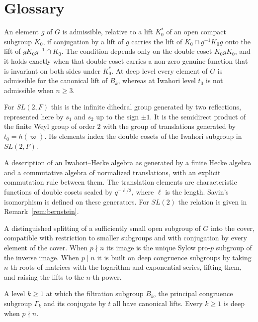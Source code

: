 \documentclass[12pt,letterpaper]{amsart}
\numberwithin{equation}{section}
\theoremstyle{definition}
\theoremstyle{remark}
\begin{document}
\section*{Glossary}

\begin{description}[leftmargin=1.5em,style=nextline]
\item[Admissible element] An element $g$ of $G$ is admissible, relative
to a lift $K_0^*$ of an open compact subgroup $K_0$, if conjugation by a
lift of $g$ carries the lift of $K_0\cap g^{-1}K_0g$ onto the lift of
$gK_0g^{-1}\cap K_0$. The condition depends only on the double coset
$K_0gK_0$, and it holds exactly when that double coset carries a
non-zero genuine function that is invariant on both sides under
$K_0^*$. At deep level every element of $G$ is admissible for the
canonical lift of $B_k$, whereas at Iwahori level $t_0$ is not
admissible when $n\geq 3$.
\item[Affine Weyl group] For $SL(2,F)$ this is the infinite dihedral
group generated by two reflections, represented here by $s_1$ and $s_2$
up to the sign $\pm 1$. It is the semidirect product of the finite Weyl
group of order $2$ with the group of translations generated by
$t_0=h(\varpi)$. Its elements index the double cosets of the Iwahori
subgroup in $SL(2,F)$.
\item[Bernstein presentation] A description of an Iwahori--Hecke algebra
as generated by a finite Hecke algebra and a commutative algebra of
normalized translations, with an explicit commutation rule between
them. The translation elements are characteristic functions of double
cosets scaled by $q^{-\ell/2}$, where $\ell$ is the length. Savin's
isomorphism is defined on these generators. For $SL(2)$ the relation is
given in Remark~\ref{rem:bernstein}.
\item[Canonical lift] A distinguished splitting of a sufficiently small
open subgroup of $G$ into the cover, compatible with restriction to
smaller subgroups and with conjugation by every element of the cover.
When $p\nmid n$ its image is the unique Sylow pro-$p$ subgroup of the
inverse image. When $p\mid n$ it is built on deep congruence subgroups
by taking $n$-th roots of matrices with the logarithm and exponential
series, lifting them, and raising the lifts to the $n$-th power.
\item[Deep level] A level $k\geq 1$ at which the filtration subgroup
$B_k$, the principal congruence subgroup $\Gamma_k$ and its conjugate by
$t$ all have canonical lifts. Every $k\geq 1$ is deep when $p\nmid n$.

\end{description}
\end{document}
